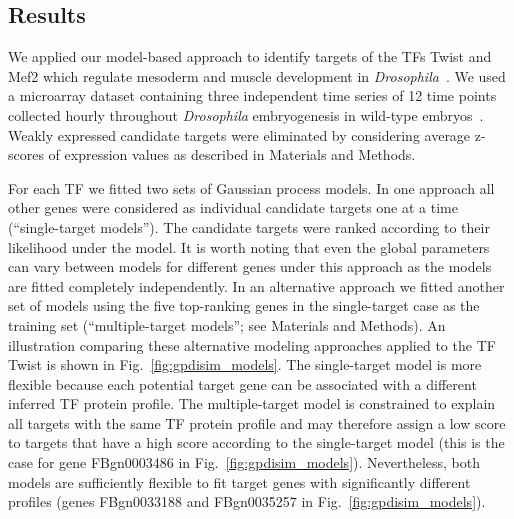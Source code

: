 \documentclass{pnastwo}
\begin{document}
\begin{article}
\section{Results}

We applied our model-based approach to identify targets of the TFs
Twist and Mef2 which regulate mesoderm and muscle development in
\emph{Drosophila}~\cite{Sandmann2007,Zinzen2009}. We used a microarray dataset
containing three independent time series of 12 time points collected
hourly throughout \emph{Drosophila} embryogenesis in wild-type
embryos~\cite{Tomancak2002}.  Weakly expressed candidate targets were eliminated by 
considering average z-scores of expression values as described in
Materials and Methods.

For each TF we fitted two sets of Gaussian process models. In one
approach all other genes were considered as individual candidate targets one at a
time (``single-target models'').  The candidate targets were ranked
according to their likelihood under the model.  It is worth noting that even the global
parameters can vary between models for different genes under this approach as the models
are fitted completely independently. In an alternative approach we fitted another set of models using the five
top-ranking genes in the single-target case as the training set (``multiple-target models''; see
Materials and Methods).  An illustration comparing these alternative
modeling approaches applied to the TF Twist is shown in Fig.~\ref{fig:gpdisim_models}. The
single-target model is more flexible because each
potential target gene can be associated with a different inferred TF
protein profile. The multiple-target model is constrained to explain
all targets with the same TF protein profile and may therefore assign
a low score to targets that have a high score according to the
single-target model (this is the case for gene FBgn0003486 in
Fig.~\ref{fig:gpdisim_models}). Nevertheless, both models are
sufficiently flexible to fit target genes with significantly different
profiles (genes FBgn0033188 and FBgn0035257 in
Fig.~\ref{fig:gpdisim_models}).


\end{article}
\end{document}
